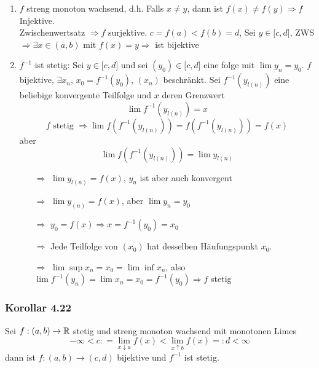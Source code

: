 \begin{beweis}{}
\begin{enumerate}
\item $f$ streng monoton wachsend, d.h. Falls $x\not=y$, dann ist $f\left( x\right)\not=f\left( y\right)\Rightarrow f$ Injektive.\\

Zwischenwertsatz $\Rightarrow f$ surjektive. $c=f(a)<f(b)=d$, Sei $y\in\lbrack c,d\rbrack$, ZWS $\Rightarrow\exists x\in\left( a,b\right)$ mit $f(x)=y\Rightarrow$ ist bijektive
\item $f^{-1}$ ist stetig: Sei $y\in\lbrack c,d\rbrack$ und sei $\left( y_0\right)\in\lbrack c,d\rbrack$ eine folge mit $\lim y_n=y_0$. $f$ bijektive, $\exists x_n$, $x_0=f^{-1}\left( y_0\right)$, $\left( x_n\right)$ beschränkt. Sei $f^{-1}\left( y_{l(n)}\right)$ eine beliebige konvergente Teilfolge und $x$ deren Grenzwert 
\[ \lim f^{-1}\left( y_{l(n)}\right)=x\]
\[ f\text{ stetig }\Rightarrow\lim f\left( f^{-1}\left( y_{l(n)}\right)\right) = f\left( f^{-1}\left( y_{l(n)}\right)\right)= f(x) \]
aber 
\[\lim f\left( {{f^{ - 1}}\left( {{y_{l(n)}}} \right)} \right) = \lim {y_{l(n)}}\]
\begin{enumerate}
\item[$\Rightarrow$] $\lim {y_{l(n)}}=f(x)$, $y_n$ ist aber auch konvergent
\item[$\Rightarrow$] $\lim {y_{(n)}}=f(x)$, aber $\lim y_n=y_0$
\item[$\Rightarrow$] $y_0=f(x)\Rightarrow x=f^{-1}\left( y_0\right)=x_0$
\item[$\Rightarrow$] Jede Teilfolge von $\left( x_0\right)$ hat desselben Häufungspunkt $x_0$.
\item[$\Rightarrow$] $\lim\sup x_n=x_0=\lim\inf x_n$, also $\lim {f^{ - 1}}\left( {{y_n}} \right) = \lim {x_n} = {x_0} = {f^{ - 1}}\left( {{y_0}} \right)\Rightarrow f$ stetig 
\end{enumerate}
\end{enumerate}
\end{beweis}

\subsubsection*{Korollar 4.22}
Sei $f:\left( a,b\right)\to\mathbb{R}$ stetig und streng monoton wachsend mit monotonen Limes
\[ - \infty  < c: = \mathop {\lim }\limits_{x \downarrow a} f\left( x \right) < \mathop {\lim }\limits_{x \uparrow b} f\left( x \right) = :d < \infty \]
dann ist $f:\left( a,b\right)\to\left( c,d\right)$ bijektive und $f^{-1}$ ist stetig.


